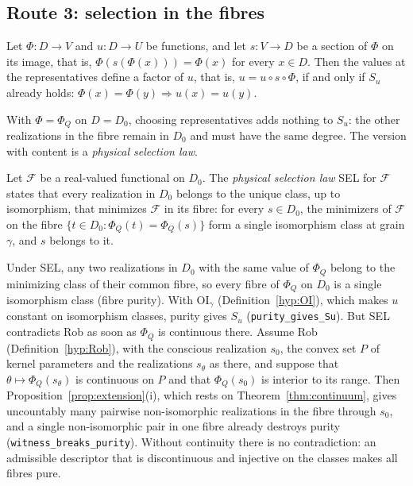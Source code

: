 \subsection{Route 3: selection in the fibres}\label{sec:via3}
\begin{theorem}\label{thm:section}
Let $\Phi:D\to V$ and $u:D\to U$ be functions, and let $s:V\to D$ be a section of $\Phi$ on its image, that is, $\Phi(s(\Phi(x)))=\Phi(x)$ for every $x\in D$. Then the values at the representatives define a factor of $u$, that is, $u=u\circ s\circ\Phi$, if and only if $S_u$ already holds: $\Phi(x)=\Phi(y)\Rightarrow u(x)=u(y)$.
\end{theorem}
With $\Phi=\Phi_Q$ on $D=D_0$, choosing representatives adds nothing to $S_u$: the other realizations in the fibre remain in $D_0$ and must have the same degree. The version with content is a \emph{physical selection law}.
\begin{definition}[SEL]\label{def:SEL}
Let $\mathcal F$ be a real-valued functional on $D_0$. The \emph{physical selection law} SEL for $\mathcal F$ states that every realization in $D_0$ belongs to the unique class, up to isomorphism, that minimizes $\mathcal F$ in its fibre: for every $s\in D_0$, the minimizers of $\mathcal F$ on the fibre $\{t\in D_0:\Phi_Q(t)=\Phi_Q(s)\}$ form a single isomorphism class at grain $\gamma$, and $s$ belongs to it.
\end{definition}
Under SEL, any two realizations in $D_0$ with the same value of $\Phi_Q$ belong to the minimizing class of their common fibre, so every fibre of $\Phi_Q$ on $D_0$ is a single isomorphism class (fibre purity). With OI$_\gamma$ (Definition~\ref{hyp:OI}), which makes $u$ constant on isomorphism classes, purity gives $S_u$ (\texttt{purity\_gives\_Su}). But SEL contradicts Rob as soon as $\Phi_Q$ is continuous there. Assume Rob (Definition~\ref{hyp:Rob}), with the conscious realization $s_0$, the convex set $P$ of kernel parameters and the realizations $s_\theta$ as there, and suppose that $\theta\mapsto\Phi_Q(s_\theta)$ is continuous on $P$ and that $\Phi_Q(s_0)$ is interior to its range. Then Proposition~\ref{prop:extension}(i), which rests on Theorem~\ref{thm:continuum}, gives uncountably many pairwise non-isomorphic realizations in the fibre through $s_0$, and a single non-isomorphic pair in one fibre already destroys purity (\texttt{witness\_breaks\_purity}). Without continuity there is no contradiction: an admissible descriptor that is discontinuous and injective on the classes makes all fibres pure.

